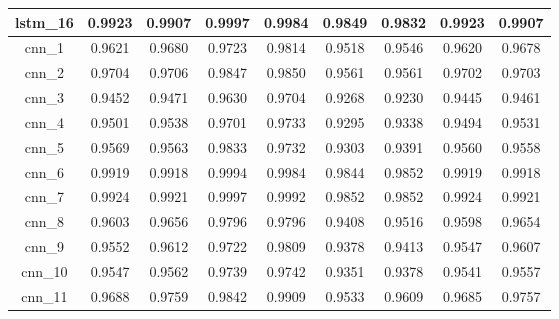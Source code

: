 \begin{table}[h]
\begin{tabular} {|c|c|c|c|c|c|c|c|c| }
        lstm\_16 & 0.9923                        & 0.9907                         & 0.9997                      & 0.9984                  & 0.9849 & 0.9832 & 0.9923 & 0.9907 \\ \hline
        cnn\_1   & 0.9621                        & 0.9680                         & 0.9723                      & 0.9814                  & 0.9518 & 0.9546 & 0.9620 & 0.9678 \\ \hline
        cnn\_2   & 0.9704                        & 0.9706                         & 0.9847                      & 0.9850                  & 0.9561 & 0.9561 & 0.9702 & 0.9703 \\ \hline
        cnn\_3   & 0.9452                        & 0.9471                         & 0.9630                      & 0.9704                  & 0.9268 & 0.9230 & 0.9445 & 0.9461 \\ \hline
        cnn\_4   & 0.9501                        & 0.9538                         & 0.9701                      & 0.9733                  & 0.9295 & 0.9338 & 0.9494 & 0.9531 \\ \hline
        cnn\_5   & 0.9569                        & 0.9563                         & 0.9833                      & 0.9732                  & 0.9303 & 0.9391 & 0.9560 & 0.9558 \\ \hline
        cnn\_6   & 0.9919                        & 0.9918                         & 0.9994                      & 0.9984                  & 0.9844 & 0.9852 & 0.9919 & 0.9918 \\ \hline
        cnn\_7   & 0.9924                        & 0.9921                         & 0.9997                      & 0.9992                  & 0.9852 & 0.9852 & 0.9924 & 0.9921 \\ \hline
        cnn\_8   & 0.9603                        & 0.9656                         & 0.9796                      & 0.9796                  & 0.9408 & 0.9516 & 0.9598 & 0.9654 \\ \hline
        cnn\_9   & 0.9552                        & 0.9612                         & 0.9722                      & 0.9809                  & 0.9378 & 0.9413 & 0.9547 & 0.9607 \\ \hline
        cnn\_10  & 0.9547                        & 0.9562                         & 0.9739                      & 0.9742                  & 0.9351 & 0.9378 & 0.9541 & 0.9557 \\ \hline
        cnn\_11  & 0.9688                        & 0.9759                         & 0.9842                      & 0.9909                  & 0.9533 & 0.9609 & 0.9685 & 0.9757 \\ \hline
    \end{tabular}
\end{table}


